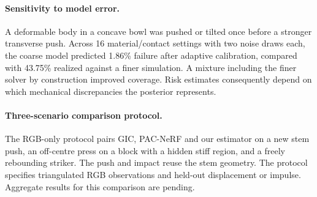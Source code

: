 \paragraph{Sensitivity to model error.}
A deformable body in a concave bowl was pushed or tilted once before a stronger transverse push. Across 16 material/contact settings with two noise draws each, the coarse model predicted 1.86\% failure after adaptive calibration, compared with 43.75\% realized against a finer simulation. A mixture including the finer solver by construction improved coverage. Risk estimates consequently depend on which mechanical discrepancies the posterior represents.

\paragraph{Three-scenario comparison protocol.}
The RGB-only protocol pairs GIC, PAC-NeRF and our estimator on a new stem push, an off-centre press on a block with a hidden stiff region, and a freely rebounding striker. The push and impact reuse the stem geometry. The protocol specifies triangulated RGB observations and held-out displacement or impulse. Aggregate results for this comparison are pending.
